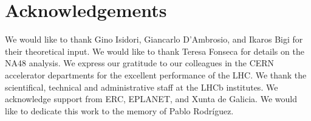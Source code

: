 \section*{Acknowledgements}
 
\noindent We would like to thank Gino Isidori, Giancarlo D'Ambrosio, and Ikaros Bigi for their
theoretical input. We would like to thank Teresa Fonseca for details on the NA48 analysis. 
We express our gratitude to our colleagues in the CERN
accelerator departments for the excellent performance of the LHC. We
thank the scientifical, technical and administrative staff at the LHCb
institutes. We acknowledge support from ERC, EPLANET, 
and Xunta de Galicia. We would like to dedicate this work to the memory of Pablo Rodr\'iguez.

